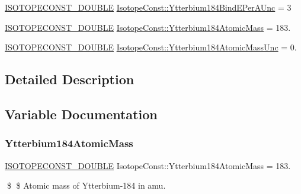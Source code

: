 \begin{DoxyCompactItemize}
\mbox{\hyperlink{group___isotope_const-_macros_ga8f45a7272ce02c0b4c65c44636ed719a}{I\+S\+O\+T\+O\+P\+E\+C\+O\+N\+S\+T\+\_\+\+D\+O\+U\+B\+LE}} \mbox{\hyperlink{group___isotope_const-_ytterbium-_yb184_ga81f4fbbcfc1e8e3f79eac48267a0c661}{Isotope\+Const\+::\+Ytterbium184\+Bind\+E\+Per\+A\+Unc}} = 3
\item 
\mbox{\hyperlink{group___isotope_const-_macros_ga8f45a7272ce02c0b4c65c44636ed719a}{I\+S\+O\+T\+O\+P\+E\+C\+O\+N\+S\+T\+\_\+\+D\+O\+U\+B\+LE}} \mbox{\hyperlink{group___isotope_const-_ytterbium-_yb184_ga7aa79cd29ad7f5b675c0bf13e31af116}{Isotope\+Const\+::\+Ytterbium184\+Atomic\+Mass}} = 183.
\item 
\mbox{\hyperlink{group___isotope_const-_macros_ga8f45a7272ce02c0b4c65c44636ed719a}{I\+S\+O\+T\+O\+P\+E\+C\+O\+N\+S\+T\+\_\+\+D\+O\+U\+B\+LE}} \mbox{\hyperlink{group___isotope_const-_ytterbium-_yb184_gab2a938633f68fb9bd83b9be8e9128c43}{Isotope\+Const\+::\+Ytterbium184\+Atomic\+Mass\+Unc}} = 0.
\end{DoxyCompactItemize}


\subsection{Detailed Description}


\subsection{Variable Documentation}
\mbox{\label{group___isotope_const-_ytterbium-_yb184_ga7aa79cd29ad7f5b675c0bf13e31af116}} 
\subsubsection{\texorpdfstring{Ytterbium184\+Atomic\+Mass}{Ytterbium184AtomicMass}}
{\footnotesize\ttfamily \mbox{\hyperlink{group___isotope_const-_macros_ga8f45a7272ce02c0b4c65c44636ed719a}{I\+S\+O\+T\+O\+P\+E\+C\+O\+N\+S\+T\+\_\+\+D\+O\+U\+B\+LE}} Isotope\+Const\+::\+Ytterbium184\+Atomic\+Mass = 183.}

\$ \$ Atomic mass of Ytterbium-\/184 in amu. \mbox{\label{group___isotope_const-_ytterbium-_yb184_gab2a938633f68fb9bd83b9be8e9128c43}} 
